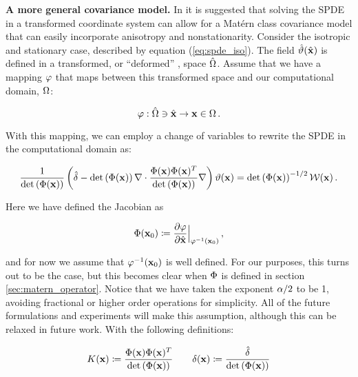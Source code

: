 \noindent\textbf{A more general covariance model. }
In \citet{RSSB:RSSB777} it is suggested that solving the SPDE in a transformed
coordinate system can allow for a Mat\'ern class covariance
model that can easily incorporate anisotropy and nonstationarity.
Consider the isotropic and stationary case, described by equation
(\ref{eq:spde_iso}).
The field $\hat{\vartheta}(\hat{\mathbf{x}})$ is defined in a transformed, or ``deformed''
\citep{sampson_nonparametric_1992}, space $\hat{\Omega}$.
Assume that we have a mapping $\varphi$ that maps between this transformed space
and our computational domain, $\Omega$:
\begin{linenomath*}\begin{equation*}
    \varphi : \hat{\Omega}\ni\hat{\mathbf{x}} \rightarrow \mathbf{x}\in\Omega \, .
\end{equation*}\end{linenomath*}
With this mapping, we can employ a change of variables
\citep{smith_change_1934} to rewrite the SPDE in the computational domain as:
\begin{linenomath*}\begin{equation*}
    \dfrac{1}{\text{det}\left(\Phi(\mathbf{x})\right)}
    \left(\hat{\delta} -
    \text{det}\left(\Phi(\mathbf{x})\right)\nabla\cdot
    \dfrac{\Phi(\mathbf{x})\Phi(\mathbf{x})^T}{\text{det}\left(\Phi(\mathbf{x})\right)}
    \nabla\right)\vartheta(\mathbf{x}) =
    \text{det}\left(\Phi(\mathbf{x})\right)^{-1/2}\mathcal{W}(\mathbf{x}) \, .
\end{equation*}\end{linenomath*}
Here we have defined the Jacobian as
\begin{linenomath*}\begin{equation*}
    \Phi(\mathbf{x}_0) \coloneqq
    \dfrac{\partial \varphi}{\partial \hat{\mathbf{x}}}\Big|_{\varphi^{-1}(\mathbf{x}_{0})} \, ,
\end{equation*}\end{linenomath*}
and for now we assume that $\varphi^{-1}(\mathbf{x}_0)$ is well defined.
For our purposes, this turns out to be the case, but this becomes clear when
$\Phi$ is defined in section \ref{sec:matern_operator}.
Notice that we have taken the exponent $\alpha/2$ to be 1, avoiding
fractional or higher order operations for simplicity.
All of the future formulations and experiments will make this assumption,
although this can be relaxed in future work.
With the following definitions:
\begin{linenomath}\begin{equation}
    K(\mathbf{x}) \coloneqq
    \dfrac{\Phi(\mathbf{x})\Phi(\mathbf{x})^T}{\text{det}\left(\Phi(\mathbf{x})\right)}
    \qquad
    \delta(\mathbf{x}) \coloneqq \dfrac{\hat{\delta}}{\text{det}\left(\Phi(\mathbf{x})\right)}
    \label{eq:matern_definitions}
\end{equation}\end{linenomath}

